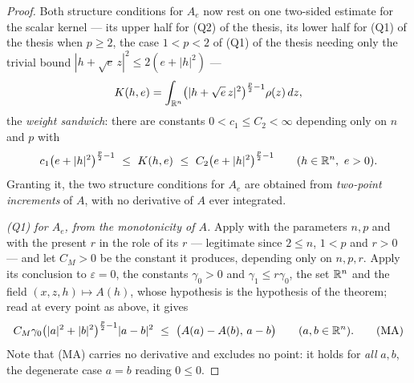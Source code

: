 \begin{proof}
Both structure conditions for $A_e$ now rest on one two-sided estimate for the
scalar kernel --- its upper half for (Q2) of the thesis, its lower half for
(Q1) of the thesis when $p\ge2$, the case $1<p<2$ of (Q1) of the thesis needing only the
trivial bound $|h+\sqrt e\,z|^2\le2(e+|h|^2)$ ---
\[
K(h,e)=\int_{\mathbb{R}^n}\bigl(|h+\sqrt e\,z|^2\bigr)^{\frac p2-1}\rho(z)\,dz ,
\]
the \emph{weight sandwich}: there are constants $0<c_1\le C_2<\infty$ depending
only on $n$ and $p$ with
\[
c_1\bigl(e+|h|^2\bigr)^{\frac p2-1}\ \le\ K(h,e)\ \le\ C_2\bigl(e+|h|^2\bigr)^{\frac p2-1}
\qquad(h\in\R^n,\ e>0).
\]
Granting it, the two structure conditions for $A_e$ are obtained from
\emph{two-point increments} of $A$, with no derivative of $A$ ever integrated.

\emph{\textup{(Q1)} for $A_e$, from the monotonicity of $A$.}  Apply
 with the parameters $n,p$ and with the
present $r$ in the role of its $r$ --- legitimate since $2\le n$, $1<p$ and
$r>0$ --- and let $C_M>0$ be the constant it produces, depending only on
$n,p,r$.  Apply its conclusion to $\varepsilon=0$, the constants
$\gamma_0>0$ and $\gamma_1\le r\gamma_0$, the set $\mathbb{R}^n$ and the field
$(x,z,h)\mapsto A(h)$, whose  hypothesis is the
hypothesis of the theorem; read at every point as above, it gives
\[
C_M\gamma_0\bigl(|a|^2+|b|^2\bigr)^{\frac p2-1}|a-b|^2
\ \le\ \bigl(A(a)-A(b),\,a-b\bigr)
\qquad(a,b\in\mathbb{R}^n).
\tag{MA}
\]
Note that (MA) carries no derivative and excludes no point: it holds for
\emph{all} $a,b$, the degenerate case $a=b$ reading $0\le0$.


\end{proof}
